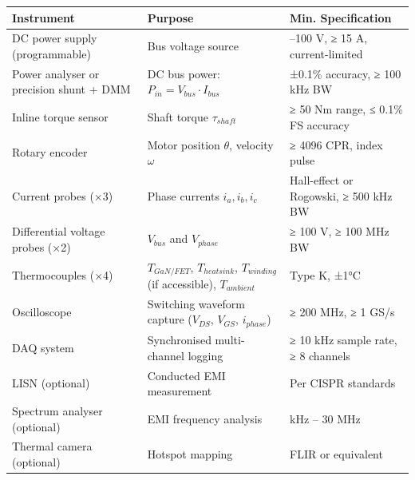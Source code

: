 \documentclass[
]{article}
\newcounter{none} %
\begin{document}
{\def\LTcaptype{none} %
\begin{longtable}[]{@{}
  >{\raggedright\arraybackslash}p{}
  >{\raggedright\arraybackslash}p{}
  >{\raggedright\arraybackslash}p{}@{}}
\toprule\noalign{}
\begin{minipage}[b]{\linewidth}\raggedright
Instrument
\end{minipage} & \begin{minipage}[b]{\linewidth}\raggedright
Purpose
\end{minipage} & \begin{minipage}[b]{\linewidth}\raggedright
Min. Specification
\end{minipage} \\
\midrule\noalign{}
\endhead
\bottomrule\noalign{}
\endlastfoot
DC power supply (programmable) & Bus voltage source & 0--100 V, ≥ 15 A,
current-limited \\
Power analyser or precision shunt + DMM & DC bus power:
\(P_{in} = V_{bus} \cdot I_{bus}\) & ±0.1\% accuracy, ≥ 100 kHz BW \\
Inline torque sensor & Shaft torque \(\tau_{shaft}\) & ≥ 50 Nm range, ≤
0.1\% FS accuracy \\
Rotary encoder & Motor position \(\theta\), velocity \(\omega\) & ≥ 4096
CPR, index pulse \\
Current probes (×3) & Phase currents \(i_a, i_b, i_c\) & Hall-effect or
Rogowski, ≥ 500 kHz BW \\
Differential voltage probes (×2) & \(V_{bus}\) and \(V_{phase}\) & ≥ 100
V, ≥ 100 MHz BW \\
Thermocouples (×4) & \(T_{GaN/FET}\), \(T_{heatsink}\), \(T_{winding}\)
(if accessible), \(T_{ambient}\) & Type K, ±1°C \\
Oscilloscope & Switching waveform capture (\(V_{DS}\), \(V_{GS}\),
\(i_{phase}\)) & ≥ 200 MHz, ≥ 1 GS/s \\
DAQ system & Synchronised multi-channel logging & ≥ 10 kHz sample rate,
≥ 8 channels \\
LISN (optional) & Conducted EMI measurement & Per CISPR standards \\
Spectrum analyser (optional) & EMI frequency analysis & 150 kHz -- 30
MHz \\
Thermal camera (optional) & Hotspot mapping & FLIR or equivalent \\
\end{longtable}
}
\end{document}
